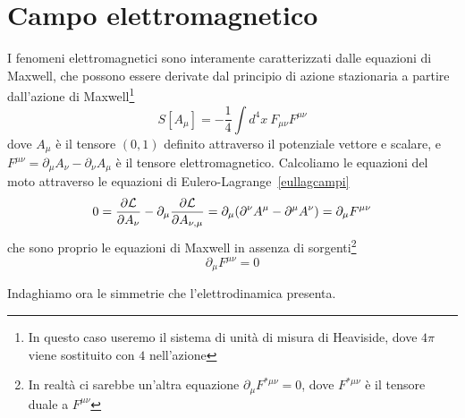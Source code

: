 \section{Campo elettromagnetico}
    I fenomeni elettromagnetici sono interamente caratterizzati dalle equazioni di Maxwell, che possono essere derivate dal principio di azione stazionaria a partire dall'azione di Maxwell\footnote{In questo caso useremo il sistema di unità di misura di Heaviside, dove $4\pi$ viene sostituito con $4$ nell'azione}
\begin{equation} \label{azionemaxwell}
    S[A_\mu] = - \frac{1}{4} \int d^4 x ~ F_{\mu\nu} F^{\mu\nu}
\end{equation}
    dove $A_\mu$ è il tensore $(0, 1)$ definito attraverso il potenziale vettore e scalare, e $F^{\mu\nu} = \partial_\mu A_\nu - \partial_\nu A_\mu$ è il tensore elettromagnetico. Calcoliamo le equazioni del moto attraverso le equazioni di Eulero-Lagrange~\eqref{eullagcampi}
\begin{equation*}
    0 = \frac{\partial\mathcal L}{\partial A_\nu} - \partial_\mu \frac{\partial\mathcal L}{\partial A_{\nu,\mu}} = \partial_\mu (\partial^\nu A^\mu - \partial^\mu A^\nu) = \partial_\mu F^{\mu\nu}
\end{equation*}
    che sono proprio le equazioni di Maxwell in assenza di sorgenti\footnote{In realtà ci sarebbe un'altra equazione $\partial_\mu F^{*\mu\nu} = 0$, dove $F^{*\mu\nu}$ è il tensore duale a $F^{\mu\nu}$}
\begin{equation}\label{eqmax}
    \partial_\mu F^{\mu\nu} = 0
\end{equation}

    Indaghiamo ora le simmetrie che l'elettrodinamica presenta.

